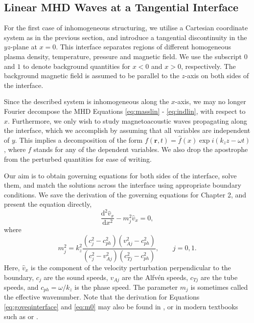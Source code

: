 \subsection{Linear MHD Waves at a Tangential Interface}
\label{subsec:linearmhdint}

For the first case of inhomogeneous structuring, we utilise a Cartesian coordinate system as in the previous section, and introduce a tangential discontinuity in the $yz$-plane at $x=0$.
This interface separates regions of different homogeneous plasma density, temperature, pressure and magnetic field.
We use the subscript $0$ and $1$ to denote background quantities for $x<0$ and $x>0$, respectively.
The background magnetic field is assumed to be parallel to the $z$-axis on both sides of the interface.

Since the described system is inhomogeneous along the $x$-axis, we may no longer Fourier decompose the MHD Equations \eqref{eq:masslin} - \eqref{eq:indlin}, with respect to $x$.
Furthermore, we only wish to study magnetoacoustic waves propagating along the interface, which we accomplish by assuming that all variables are independent of $y$.
This implies a decomposition of the form $f(\mathbf{r}, t) = \hat f(x) \exp{i(k_z z - \omega t)}$, where $f$ stands for any of the dependent variables.
We also drop the apostrophe from the perturbed quantities for ease of writing.

Our aim is to obtain governing equations for both sides of the interface, solve them, and match the solutions across the interface using appropriate boundary conditions.
We save the derivation of the governing equations for Chapter 2, and present the equation directly,
%
\begin{equation}
\label{eq:goveqinterface}
\frac{\mathrm{d}^2 \hat{v}_x}{\mathrm{d} x^2} - m_{j}^2 \hat{v}_x = 0,
\end{equation}
%
where
%
\begin{equation}
\label{eq:m0}
m_j^2 = k_z^2 
\frac{(c_j^2 - c_{ph}^2)(v_{A j}^2 - c_{ph}^2)}
{(c_j^2 - v_{A j}^2)(c_{T j}^2 - c_{ph}^2)},
\qquad
j = 0, 1.
\end{equation}
%
Here, $\hat{v}_x$ is the component of the velocity perturbation perpendicular to the boundary, $c_j$ are the sound speeds, $v_{A j}$ are the Alfv\'en speeds, $c_{T j}$ are the tube speeds, and $c_{ph} = \omega / k_z$ is the phase speed.
The parameter $m_j$ is sometimes called the effective wavenumber.
Note that the derivation for Equations \eqref{eq:goveqinterface} and \eqref{eq:m0} may also be found in \cite{Roberts1981}, or in modern textbooks such as \cite{Goedbloed2004} or \cite{Priest2014}.

